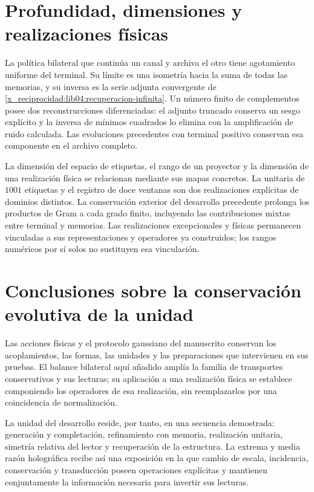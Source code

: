 \section{Profundidad, dimensiones y realizaciones físicas}
\label{x_reciprocidad:lib06:profundidad}

La política bilateral que continúa un canal y archiva el otro
tiene agotamiento uniforme del terminal. Su límite es una
isometría hacia la suma de todas las memorias, y su inversa es
la serie adjunta convergente de
\eqref{x_reciprocidad:lib04:recuperacion-infinita}. Un número finito de
complementos posee dos reconstrucciones diferenciadas: el
adjunto truncado conserva un sesgo explícito y la inversa de
mínimos cuadrados lo elimina con la amplificación de ruido
calculada. Las evoluciones precedentes con terminal positivo
conservan esa componente en el archivo completo.

La dimensión del espacio de etiquetas, el rango de un proyector y
la dimensión de una realización física se relacionan mediante
sus mapas concretos. La unitaria de \(1001\) etiquetas y el
registro de doce ventanas son dos realizaciones explícitas de
dominios distintos. La conservación exterior del desarrollo
precedente prolonga los productos de Gram a cada grado finito,
incluyendo las contribuciones mixtas entre terminal y memorias.
Las realizaciones excepcionales y físicas permanecen vinculadas
a sus representaciones y operadores ya construidos; los rangos
numéricos por sí solos no sustituyen esa vinculación.

\section{Conclusiones sobre la conservación evolutiva de la unidad}
Las acciones físicas y el protocolo gaussiano del manuscrito
conservan los acoplamientos, las formas, las unidades y las
preparaciones que intervienen en sus pruebas. El balance
bilateral aquí añadido amplía la familia de transportes
conservativos y sus lecturas; su aplicación a una realización
física se establece componiendo los operadores de esa
realización, sin reemplazarlos por una coincidencia de
normalización.

La unidad del desarrollo reside, por tanto, en una secuencia
demostrada: generación y completación, refinamiento con memoria,
realización unitaria, simetría relativa del lector y recuperación
de la estructura. La extrema y media razón holográfica recibe
así una exposición en la que cambio de escala, incidencia,
conservación y transducción poseen operaciones explícitas y
mantienen conjuntamente la información necesaria para invertir
sus lecturas.

